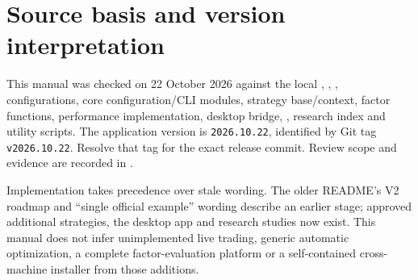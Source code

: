 \documentclass[11pt]{article}
\newcommand{\code}[1]{\nolinkurl{#1}}
\let\originalsection\section
\renewcommand{\section}{\Needspace{9\baselineskip}\originalsection}
\begin{document}
\appendix
\section{Source basis and version interpretation}
This manual was checked on 22 October 2026 against the local , , , configurations, core configuration/CLI modules, strategy base/context, factor functions, performance implementation, desktop bridge, , research index and utility scripts. The application version is \code{2026.10.22}, identified by Git tag \code{v2026.10.22}. Resolve that tag for the exact release commit. Review scope and evidence are recorded in .

Implementation takes precedence over stale wording. The older README's V2 roadmap and ``single official example'' wording describe an earlier stage; approved additional strategies, the desktop app and research studies now exist. This manual does not infer unimplemented live trading, generic automatic optimization, a complete factor-evaluation platform or a self-contained cross-machine installer from those additions.
\end{document}
